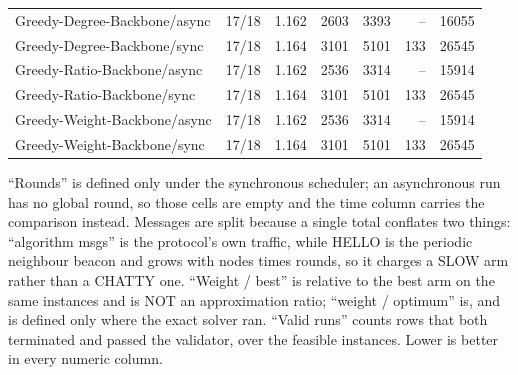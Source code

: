 \begin{table}[tb]
\begin{tabular}{lrrrrrr}
Greedy-Degree-Backbone/async & 17/18 & 1.162 & 2603 & 3393 & -- & 16055 \\
Greedy-Degree-Backbone/sync & 17/18 & 1.164 & 3101 & 5101 & 133 & 26545 \\
Greedy-Ratio-Backbone/async & 17/18 & 1.162 & 2536 & 3314 & -- & 15914 \\
Greedy-Ratio-Backbone/sync & 17/18 & 1.164 & 3101 & 5101 & 133 & 26545 \\
Greedy-Weight-Backbone/async & 17/18 & 1.162 & 2536 & 3314 & -- & 15914 \\
Greedy-Weight-Backbone/sync & 17/18 & 1.164 & 3101 & 5101 & 133 & 26545 \\
\bottomrule
\end{tabular}
\begin{flushleft}\footnotesize
``Rounds'' is defined only under the synchronous scheduler; an asynchronous run has no global round, so those cells are empty and the time column carries the comparison instead. Messages are split because a single total conflates two things: ``algorithm msgs'' is the protocol's own traffic, while HELLO is the periodic neighbour beacon and grows with nodes times rounds, so it charges a SLOW arm rather than a CHATTY one. ``Weight / best'' is relative to the best arm on the same instances and is NOT an approximation ratio; ``weight / optimum'' is, and is defined only where the exact solver ran. ``Valid runs'' counts rows that both terminated and passed the validator, over the feasible instances. Lower is better in every numeric column.
\end{flushleft}
\end{table}
